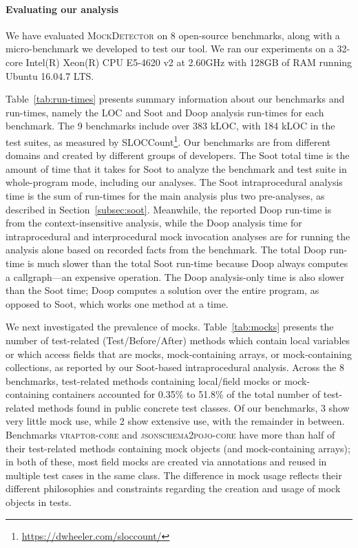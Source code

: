\paragraph{Evaluating our analysis} We have evaluated \textsc{MockDetector} on 8 open-source benchmarks, along with a micro-benchmark we developed to test our tool. We ran our experiments on a 32-core Intel(R) Xeon(R) CPU E5-4620 v2 at 2.60GHz with 128GB of RAM running Ubuntu 16.04.7 LTS.

Table~\ref{tab:run-times} presents summary information about our benchmarks and run-times, namely the LOC and Soot and Doop analysis run-times for each benchmark. The 9 benchmarks include over 383 kLOC, with 184 kLOC in the test suites, as measured by SLOCCount\footnote{\url{https://dwheeler.com/sloccount/}}.  Our benchmarks are from different domains and created by different groups of developers. The Soot total time is the amount of time that it takes for Soot to analyze the benchmark and test suite in whole-program mode, including our analyses. The Soot intraprocedural analysis time is the sum of run-times for the main analysis plus two pre-analyses, as described in Section~\ref{subsec:soot}. Meanwhile, the reported Doop run-time is from the context-insensitive analysis, while the Doop analysis time for intraprocedural and interprocedural mock invocation analyses are for running the analysis alone based on recorded facts from the benchmark. The total Doop run-time is much slower than the total Soot run-time because Doop always computes a callgraph---an expensive operation. The Doop analysis-only time is also slower than the Soot time; Doop computes a solution over the entire program, as opposed to Soot, which works one method at a time.

We next investigated the prevalence of mocks. Table~\ref{tab:mocks} presents the number of test-related (Test/Before/After) methods which contain local variables or which access fields that are mocks, mock-containing arrays, or mock-containing collections, as reported by our Soot-based intraprocedural analysis. Across the 8 benchmarks, test-related methods containing local/field mocks or mock-containing containers accounted for 0.35\% to 51.8\% of the total number of test-related methods found in public concrete test classes. Of our benchmarks, 3 show very little mock use, while 2 show extensive use, with the remainder in between. Benchmarks \textsc{vraptor-core} and \textsc{jsonschema2pojo-core} have more than half of their test-related methods containing mock objects (and mock-containing arrays); in both of these, most field mocks are created via annotations and reused in multiple test cases in the same class. The difference in mock usage reflects their different philosophies and constraints regarding the creation and usage of mock objects in tests.


